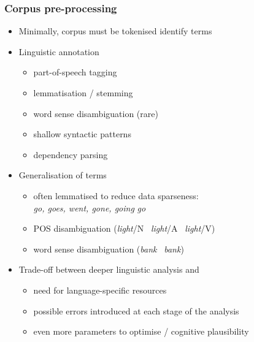 \begin{frame}
  \frametitle{Corpus pre-processing}
  \begin{itemize}
  \item Minimally, corpus must be tokenised \so identify terms
  \item Linguistic annotation
    \begin{itemize}
    \item part-of-speech tagging
    \item lemmatisation / stemming
    \item word sense disambiguation (rare)
    \item shallow syntactic patterns
    \item dependency parsing
    \end{itemize}
    \pause
  \item Generalisation of terms
    \begin{itemize}
    \item often lemmatised to reduce data sparseness:\\
      \emph{go, goes, went, gone, going} \so \emph{go}
    \item POS disambiguation (\emph{light}/N \vs\ \emph{light}/A \vs\ \emph{light}/V)
    \item word sense disambiguation (\emph{bank} \vs\ \emph{bank})
    \end{itemize}
  \pause
  \item Trade-off between deeper linguistic analysis and
    \begin{itemize}
    \item need for language-specific resources
    \item possible errors introduced at each stage of the analysis
    \item even more parameters to optimise / cognitive plausibility
    \end{itemize}
  \end{itemize}
\end{frame}

